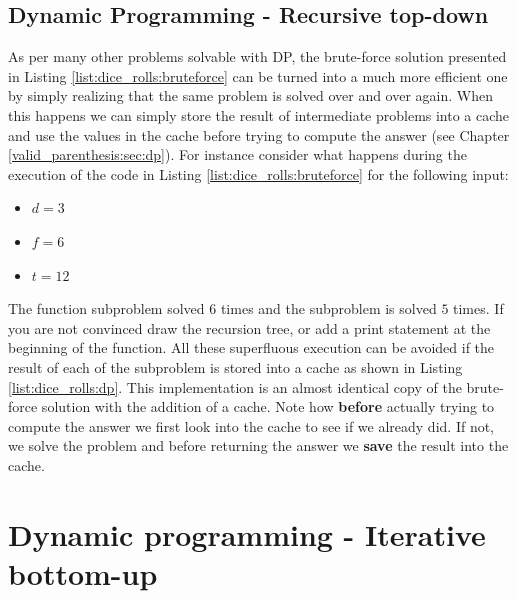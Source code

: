 \subsection{Dynamic Programming - Recursive top-down}
\label{dice_rolls:sec:DP}
As per many other problems solvable with DP, the brute-force solution presented in Listing \ref{list:dice_rolls:bruteforce} can be turned into a much more efficient one by simply realizing that the same problem is solved over and over again. When this happens we can simply store the result of intermediate problems into a cache and use the values in the cache before trying to compute the answer (see Chapter \ref{valid_parenthesis:sec:dp}). 
For instance consider what happens during the execution of the code in Listing \ref{list:dice_rolls:bruteforce} for the following input:
\begin{itemize}
	\item $d = 3$
	\item $f = 6$
	\item $t = 12$
\end{itemize}

The function subproblem  solved $6$ times and the subproblem  is solved $5$ times. If you are not convinced draw the recursion tree, or add a print statement at the beginning of the function. All these superfluous execution can be avoided if the result of each of the subproblem is stored into a cache as shown in Listing \ref{list:dice_rolls:dp}. This implementation is an almost identical copy of the brute-force solution with the addition of a cache. Note how \textbf{before} actually trying to compute the answer we first look into the cache to see if we already did. If not, we solve the problem and before returning the answer we \textbf{save} the result into the cache.



\section{Dynamic programming - Iterative bottom-up}
\label{dice_rolls:sec:bottom}

